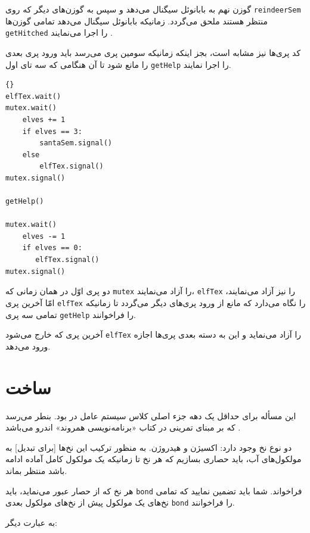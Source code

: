 \documentclass{book}
\begin{document}
     گوزن نهم به بابانوئل سیگنال می‌دهد و سپس به گوزن‌های دیگر که روی  {\tt reindeerSem} منتظر هستند ملحق می‌گردد. 
     زمانیکه بابانوئل سیگنال می‌دهد تمامی گوزن‌ها {\tt getHitched} را اجرا می‌نمایند .
    

    کد پری‌‌ها نیز مشابه است، بجز اینکه زمانیکه سومین پری می‌رسد باید ورود پری بعدی را مانع شود تا آن هنگامی که سه تای اول {\tt getHelp} را اجرا نمایند. 

\newpage
\begin{latin}
\begin{lstlisting}[title=\rl{راه‌حل مسأله بابانوئل (پری‌ها)}]{}
elfTex.wait()
mutex.wait()
    elves += 1
    if elves == 3:
        santaSem.signal()
    else
        elfTex.signal()
mutex.signal()

getHelp()

mutex.wait()
    elves -= 1
    if elves == 0:
       elfTex.signal()
mutex.signal()
\end{lstlisting}
\end{latin}

    دو پری اوّل در همان زمانی که {\tt mutex} را  آزاد می‌نمایند، {\tt elfTex} را نیز آزاد می‌نمایند،‌ امّا آخرین پری  {\tt elfTex} را نگاه می‌دارد که 
    مانع از ورود پری‌های دیگر می‌گردد تا زمانیکه تمامی سه پری {\tt getHelp} را فراخوانند. 

    آخرین پری که خارج می‌شود {\tt elfTex} را آزاد می‌نماید و این به دسته‌ بعدی پری‌ها اجازه ورود می‌دهد. 
    

\newpage
\section{ساخت  }
\label{water}

    این مسأله برای حداقل یک دهه جزء اصلی کلاس سیستم عامل در   بود. بنطر می‌رسد که بر مبنای تمرینی 
    در کتاب «برنامه‌نویسی همروند» اندرو می‌باشد \cite{andrews}.

    دو نوع نخ وجود دارد: اکسیژن و هیدروژن. به منظور ترکیب این نخ‌ها [برای تبدیل] به مولکول‌های آب، باید حصاری بسازیم که هر نخ تا زمانیکه یک مولکول کامل 
    آماده ادامه باشد منتظر بماند. 

    هر نخ که از حصار عبور می‌نماید، باید {\tt bond} فراخواند. شما باید تضمین نمایید که تمامی نخ‌های یک مولکول پیش از نخ‌های مولکول بعدی {\tt bond} 
    را فراخوانند. 


    به عبارت دیگر: 
\end{document}
